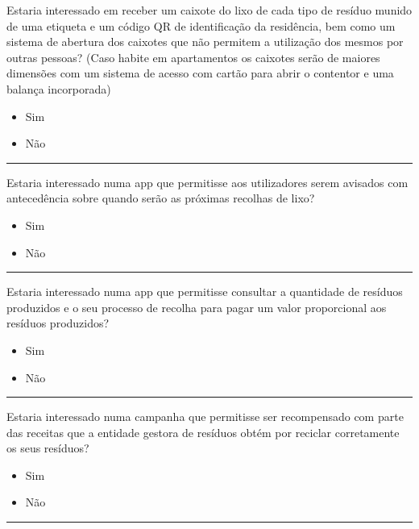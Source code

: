 \documentclass[11pt, a4paper, oneside]{book}
\begin{document}
\begin{appendices}
\begin{mdframed}[innerleftmargin=7.5mm, innerrightmargin=7.5mm, innertopmargin=7.5mm, innerbottommargin=7.5mm]
Estaria interessado em receber um caixote do lixo de cada tipo de resíduo munido de uma etiqueta e um código QR de identificação da residência, bem como um sistema de abertura dos caixotes que não permitem a utilização dos mesmos por outras pessoas? (Caso habite em apartamentos os caixotes serão de maiores dimensões com um sistema de acesso com cartão para abrir o contentor e uma balança incorporada)
\begin{itemize}[label={\huge $\circ$}]
    \itemsep0em
    \item Sim
    \item Não
\end{itemize}
\vspace{-0.7em}\rule{\linewidth}{0.5pt}\vspace{0.5em}

Estaria interessado numa app que permitisse aos utilizadores serem avisados com antecedência sobre quando serão as próximas recolhas de lixo?
\begin{itemize}[label={\huge $\circ$}]
    \itemsep0em
    \item Sim
    \item Não
\end{itemize}
\vspace{-0.7em}\rule{\linewidth}{0.5pt}\vspace{0.5em}

Estaria interessado numa app que permitisse consultar a quantidade de resíduos produzidos e o seu processo de recolha para pagar um valor proporcional aos resíduos produzidos?
\begin{itemize}[label={\huge $\circ$}]
    \itemsep0em
    \item Sim
    \item Não
\end{itemize}
\vspace{-0.7em}\rule{\linewidth}{0.5pt}\vspace{0.5em}

Estaria interessado numa campanha que permitisse ser recompensado com parte das receitas que a entidade gestora de resíduos obtém por reciclar corretamente os seus resíduos?
\begin{itemize}[label={\huge $\circ$}]
    \itemsep0em
    \item Sim
    \item Não
\end{itemize}
\vspace{-0.7em}\rule{\linewidth}{0.5pt}\vspace{0.5em}


\end{mdframed}
\end{appendices}
\end{document}
